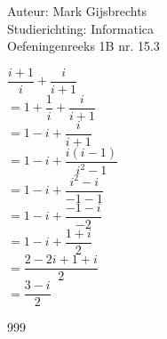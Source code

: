 \documentclass[a4paper]{article}
\begin{document}
\noindent \large Auteur: Mark Gijsbrechts \\
\noindent \large Studierichting: Informatica\\
\noindent \large Oefeningenreeks 1B nr. 15.3\\

\medskip

\normalsize



$\dfrac{i + 1}{i} + \dfrac{i} {i+1}$ \\

$=1 + \dfrac{1}{i} + \dfrac{i}{i+1}$ \\

$=1 -i + \dfrac{i}{i+1}$ \\

$=1 -i + \dfrac{i\left(i-1\right)}{i^2-1}$ \\

$=1 -i + \dfrac{i^2 - i}{-1-1}$ \\

$=1 -i + \dfrac{-1-i}{-2}$ \\

$=1 -i + \dfrac{1 + i}{2}$ \\

$=\dfrac{2 -2i + 1 + i}{2}$ \\

$=\dfrac{3-i}{2}$ \\


\begin{thebibliography}{999}
\end{thebibliography}
\end{document}

